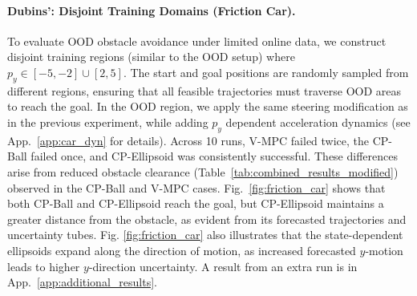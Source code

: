 \documentclass{l4dc2026}
\begin{document}
\paragraph{Dubins': Disjoint Training Domains (Friction Car).} 
To evaluate OOD obstacle avoidance under limited online data, we construct disjoint training regions (similar to the OOD setup) where  $p_y \in [-5, -2] \cup [2,5]$. The start and goal positions are randomly sampled from different regions, ensuring that all feasible trajectories must traverse OOD areas to reach the goal. In the OOD region, we apply the same steering modification as in the previous experiment, while adding $p_y$ dependent acceleration dynamics (see App.~\ref{app:car_dyn} for details).
Across 10 runs, V-MPC failed twice, the CP-Ball failed once, and CP-Ellipsoid was consistently successful. These differences arise from reduced obstacle clearance (Table~\ref{tab:combined_results_modified}) observed in the CP-Ball and V-MPC cases. Fig.~\ref{fig:friction_car} shows that both CP-Ball and CP-Ellipsoid reach the goal, but CP-Ellipsoid maintains a greater distance from the obstacle, as evident from its forecasted trajectories and uncertainty tubes. Fig. \ref{fig:friction_car} also illustrates that the state-dependent ellipsoids expand along the direction of motion, as increased forecasted $y$-motion leads to higher $y$-direction uncertainty. A result from an extra run is in App.~\ref{app:additional_results}.
\end{document}
